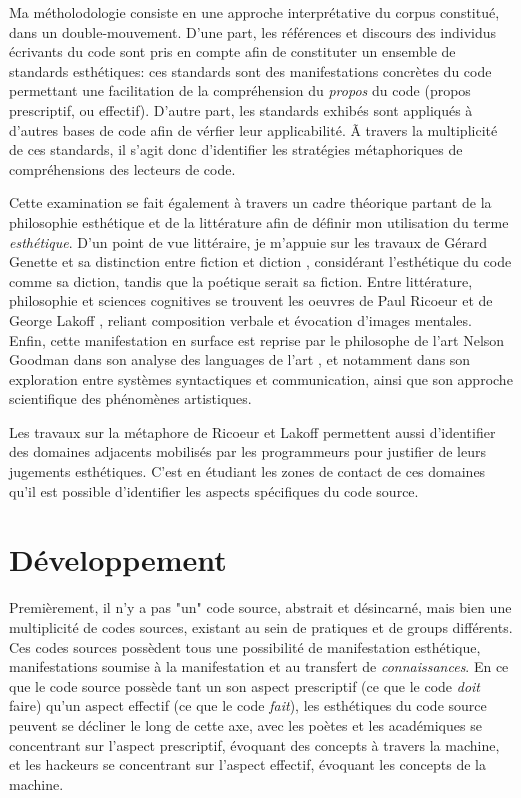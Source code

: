 \documentclass{article}
\begin{document}
Ma métholodologie consiste en une approche interprétative du corpus constitué, dans un double-mouvement. D'une part, les références et discours des individus écrivants du code sont pris en compte afin de constituter un ensemble de standards esthétiques: ces standards sont des manifestations concrètes du code permettant une facilitation de la compréhension du \emph{propos} du code (propos prescriptif, ou effectif). D'autre part, les standards exhibés sont appliqués à d'autres bases de code afin de vérfier leur applicabilité. Ã travers la multiplicité de ces standards, il s'agit donc d'identifier les stratégies métaphoriques de compréhensions des lecteurs de code.

Cette examination se fait également à travers un cadre théorique partant de la philosophie esthétique et de la littérature afin de définir mon utilisation du terme \emph{esthétique}. D'un point de vue littéraire, je m'appuie sur les travaux de Gérard Genette et sa distinction entre fiction et diction \citep{genette_fiction_1993}, considérant l'esthétique du code comme sa diction, tandis que la poétique serait sa fiction. Entre littérature, philosophie et sciences cognitives se trouvent les oeuvres de Paul Ricoeur \citep{ricoeur_rule_2003} et de George Lakoff \citep{lakoff_metaphors_1980}, reliant composition verbale et évocation d'images mentales. Enfin, cette manifestation en surface est reprise par le philosophe de l'art Nelson Goodman dans son analyse des languages de l'art \citep{goodman_languages_1976}, et notamment dans son exploration entre systèmes syntactiques et communication, ainsi que son approche scientifique des phénomènes artistiques.

Les travaux sur la métaphore de Ricoeur et Lakoff permettent aussi d'identifier des domaines adjacents mobilisés par les programmeurs pour justifier de leurs jugements esthétiques. C'est en étudiant les zones de contact de ces domaines qu'il est possible d'identifier les aspects spécifiques du code source.

\section{Développement}

Premièrement, il n'y a pas "un" code source, abstrait et désincarné, mais bien une multiplicité de codes sources, existant au sein de pratiques et de groups différents. Ces codes sources possèdent tous une possibilité de manifestation esthétique, manifestations soumise à la manifestation et au transfert de \emph{connaissances}. En ce que le code source possède tant un son aspect prescriptif (ce que le code \emph{doit} faire) qu'un aspect effectif (ce que le code \emph{fait}), les esthétiques du code source peuvent se décliner le long de cette axe, avec les poètes et les académiques se concentrant sur l'aspect prescriptif, évoquant des concepts à travers la machine, et les hackeurs se concentrant sur l'aspect effectif, évoquant les concepts de la machine.
\end{document}
